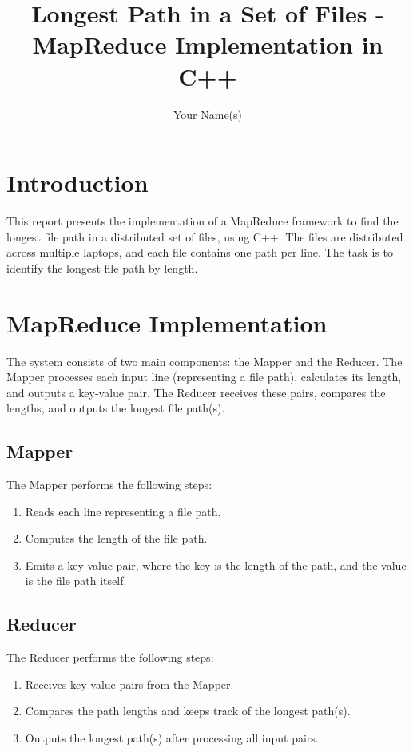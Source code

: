 \documentclass{article}
\title{Longest Path in a Set of Files - MapReduce Implementation in C++}
\author{Your Name(s)}
\begin{document}
\maketitle

\section{Introduction}
This report presents the implementation of a MapReduce framework to find the longest file path in a distributed set of files, using C++. The files are distributed across multiple laptops, and each file contains one path per line. The task is to identify the longest file path by length.

\section{MapReduce Implementation}
The system consists of two main components: the Mapper and the Reducer. The Mapper processes each input line (representing a file path), calculates its length, and outputs a key-value pair. The Reducer receives these pairs, compares the lengths, and outputs the longest file path(s).

\subsection{Mapper}
The Mapper performs the following steps:
\begin{enumerate}
  \item Reads each line representing a file path.
  \item Computes the length of the file path.
  \item Emits a key-value pair, where the key is the length of the path, and the value is the file path itself.
\end{enumerate}

\subsection{Reducer}
The Reducer performs the following steps:
\begin{enumerate}
  \item Receives key-value pairs from the Mapper.
  \item Compares the path lengths and keeps track of the longest path(s).
  \item Outputs the longest path(s) after processing all input pairs.
\end{enumerate}
\end{document}
